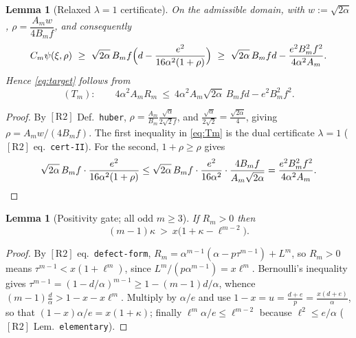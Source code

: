 \documentclass[11pt]{amsart}
\newtheorem{lemma}[theorem]{Lemma}
\newcommand{\RII}{[\textrm{R2}]}
\begin{document}
\begin{lemma}[Relaxed $\lambda=1$ certificate]\label{lem:relax}
On the admissible domain, with $w:=\sqrt{2\alpha}$,
$\rho=\dfrac{A_m w}{4B_m f}$, and consequently
\begin{equation}\label{eq:Tm}
 C_m\psi(\xi,\rho)\ \ge\ \sqrt{2\alpha}\,B_mf\Bigl(d-\frac{e^2}{16\alpha^2(1+\rho)}\Bigr)
 \ \ge\ \sqrt{2\alpha}\,B_mfd-\frac{e^2B_m^2f^2}{4\alpha^2A_m}.
\end{equation}
Hence \eqref{eq:target} follows from
\begin{equation}\label{eq:Tm2}
 (T_m):\qquad 4\alpha^2A_m R_m\ \le\ 4\alpha^2 A_m\sqrt{2\alpha}\,B_mfd-e^2B_m^2f^2 .
\end{equation}
\end{lemma}

\begin{proof}
By $\RII$ Def.~\texttt{huber}, $\rho=\tfrac{A_m}{B_m}\tfrac{\sqrt\alpha}{2\sqrt2 f}$, and
$\tfrac{\sqrt\alpha}{2\sqrt2}=\tfrac{\sqrt{2\alpha}}4$, giving $\rho=A_mw/(4B_mf)$.
The first inequality in \eqref{eq:Tm} is the dual certificate $\lambda=1$
($\RII$ eq.~\texttt{cert-II}).  For the second, $1+\rho\ge\rho$ gives
\[
 \sqrt{2\alpha}\,B_mf\cdot\frac{e^2}{16\alpha^2(1+\rho)}
 \le \sqrt{2\alpha}\,B_mf\cdot\frac{e^2}{16\alpha^2}\cdot\frac{4B_mf}{A_m\sqrt{2\alpha}}
 =\frac{e^2B_m^2f^2}{4\alpha^2A_m}. \qedhere
\]
\end{proof}

\begin{lemma}[Positivity gate; all odd $m\ge3$]\label{lem:gate}
If $R_m>0$ then
\begin{equation}\label{eq:gate}
 (m-1)\kappa\ >\ x\bigl(1+\kappa-\ell^{m-2}\bigr).
\end{equation}
\end{lemma}

\begin{proof}
By $\RII$ eq.~\texttt{defect-form}, $R_m=\alpha^{m-1}(\alpha-p\tau^{m-1})+L^m$, so
$R_m>0$ means $\tau^{m-1}<x(1+\ell^m)$, since $L^m/(p\alpha^{m-1})=x\ell^m$.
Bernoulli's inequality gives $\tau^{m-1}=(1-d/\alpha)^{m-1}\ge1-(m-1)d/\alpha$,
whence $(m-1)\tfrac d\alpha>1-x-x\ell^m$.  Multiply by $\alpha/e$ and use
$1-x=u=\tfrac{d+e}p=\tfrac{x(d+e)}\alpha$, so that $(1-x)\alpha/e=x(1+\kappa)$;
finally $\ell^m\alpha/e\le\ell^{m-2}$ because $\ell^2\le e/\alpha$
($\RII$ Lem.~\texttt{elementary}).
\end{proof}
\end{document}

